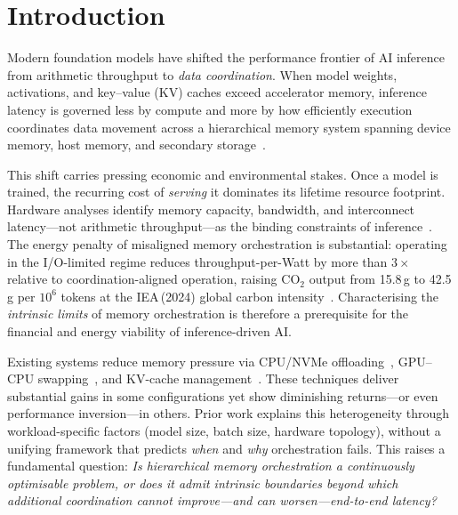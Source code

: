\section{Introduction}
\label{sec:introduction}

Modern foundation models have shifted the performance frontier of AI inference
from arithmetic throughput to \emph{data coordination}.
When model weights, activations, and key--value (KV) caches exceed accelerator
memory, inference latency is governed less by compute and more by how efficiently
execution coordinates data movement across a hierarchical memory system spanning
device memory, host memory, and secondary
storage~\cite{ma2026inference,gholami2024memorywall}.

This shift carries pressing economic and environmental stakes.
Once a model is trained, the recurring cost of \emph{serving} it dominates its
lifetime resource footprint.
Hardware analyses identify memory capacity, bandwidth, and interconnect
latency---not arithmetic throughput---as the binding constraints of
inference~\cite{zhou2024survey}.
The energy penalty of misaligned memory orchestration is substantial: operating
in the I/O-limited regime reduces throughput-per-Watt by more than $3\times$
relative to coordination-aligned operation, raising CO$_2$ output from
15.8\,g to 42.5\,g per $10^6$ tokens at the IEA\,(2024) global carbon
intensity~\cite{iea2024electricity}.
Characterising the \emph{intrinsic limits} of memory orchestration is therefore
a prerequisite for the financial and energy viability of inference-driven AI.

Existing systems reduce memory pressure via CPU/NVMe
offloading~\cite{flexgen2023,aminabadi2022deepspeedinference},
GPU--CPU swapping~\cite{huang2020swapadvisor},
and KV-cache management~\cite{kwon2023pagedattention}.
These techniques deliver substantial gains in some configurations yet show
diminishing returns---or even performance inversion---in others.
Prior work explains this heterogeneity through workload-specific factors
(model size, batch size, hardware topology), without a unifying framework that
predicts \emph{when} and \emph{why} orchestration fails.
This raises a fundamental question: \emph{Is hierarchical memory orchestration
a continuously optimisable problem, or does it admit intrinsic boundaries beyond
which additional coordination cannot improve---and can worsen---end-to-end
latency?}

